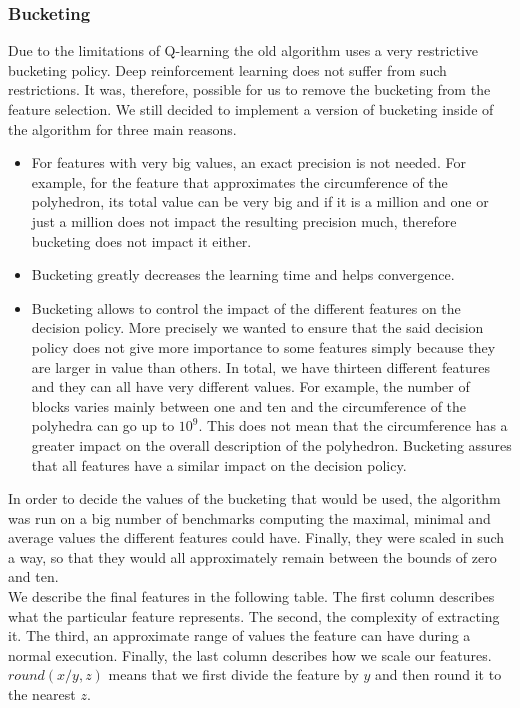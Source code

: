 \subsubsection{Bucketing}
Due to the limitations of Q-learning the old algorithm uses a very restrictive bucketing policy. Deep reinforcement learning does not suffer from such restrictions. It was, therefore, possible for us to remove the bucketing from the feature selection. We still decided to implement a version of bucketing inside of the algorithm for three main reasons. \\
\begin{itemize}
	\item For features with very big values, an exact precision is not needed. For example, for the feature that approximates the circumference of the polyhedron, its total value can be very big and if it is a million and one or just a million does not impact the resulting precision much, therefore bucketing does not impact it either.
	\item Bucketing greatly decreases the learning time and helps convergence.
	\item Bucketing allows to control the impact of the different features on the decision policy. More precisely we wanted to ensure that the said decision policy does not give more importance to some features simply because they are larger in value than others. In total, we have thirteen different features and they can all have very different values. For example, the number of blocks varies mainly between one and ten and the circumference of the polyhedra can go up to $10^9$. This does not mean that the circumference has a greater impact on the overall description of the polyhedron. Bucketing assures that all features have a similar impact on the decision policy.
\end{itemize}
In order to decide the values of the bucketing that would be used,  the algorithm was run on a big number of benchmarks computing the maximal, minimal and average values the different features could have. Finally, they were scaled in such a way, so that they would all approximately remain between the bounds of zero and ten.\\
We describe the final features in the following table. The first column describes what the particular feature represents. The second, the complexity of extracting it. The third, an approximate range of values the feature can have during a normal execution. Finally, the last column describes how we scale our features. $round(x/y,z)$ means that we first divide the feature by $y$ and then round it to the nearest $z$.
